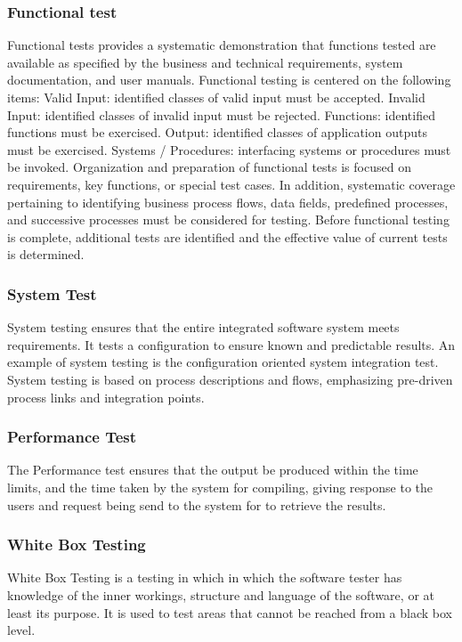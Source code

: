 \documentclass[12pt]{report}
\begin{document}
\subsubsection{Functional test}
Functional tests provides a systematic demonstration that functions tested are
available as specified by the business and technical requirements, system
documentation, and user manuals. Functional testing is centered on the following
items:
Valid Input: identified classes of valid input must be accepted.
Invalid Input: identified classes of invalid input must be rejected.
Functions: identified functions must be exercised.
Output: identified classes of application outputs must be exercised.
Systems / Procedures: interfacing systems or procedures must be invoked.
Organization and preparation of functional tests is focused on requirements,
key functions, or special test cases. In addition, systematic coverage pertaining to
identifying business process flows, data fields, predefined processes, and successive
processes must be considered for testing. Before functional testing is complete,
additional tests are identified and the effective value of current tests is determined.
\subsubsection{System Test}
System testing ensures that the entire integrated software system meets
requirements. It tests a configuration to ensure known and predictable results. An
example of system testing is the configuration oriented system integration test.
System testing is based on process descriptions and flows, emphasizing pre-driven
process links and integration points.
\subsubsection{Performance Test}
The Performance test ensures that the output be produced within the time
limits, and the time taken by the system for compiling, giving response to the users
and request being send to the system for to retrieve the results.
\subsubsection{White Box Testing}
White Box Testing is a testing in which in which the software tester has
knowledge of the inner workings, structure and language of the software, or at least its
purpose. It is used to test areas that cannot be reached from a black box level.
\end{document}
